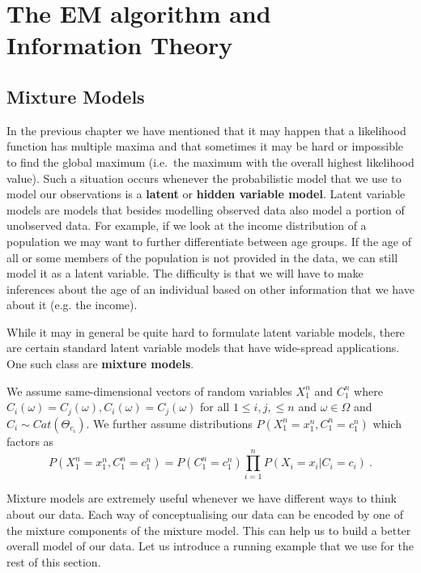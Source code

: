 \chapter{The EM algorithm and Information Theory}

\section{Mixture Models}\label{sec:mixtureModels}

In the previous chapter we have mentioned that it may happen that a likelihood function has multiple 
maxima and that sometimes it may be hard or impossible to find the global maximum (i.e.\ the maximum
with the overall highest likelihood value). Such a situation occurs whenever the probabilistic model
that we use to model our observations is a \textbf{latent} or \textbf{hidden variable model}. Latent variable
models are models that besides modelling observed data also model a portion of unobserved data. For
example, if we look at the income distribution of a population we may want to further differentiate
between age groups. If the age of all or some members of the population is not provided in the data, we
can still model it as a latent variable. The difficulty is that we will have to make inferences about the
age of an individual based on other information that we have about it (e.g. the income). 

While it may in general be quite hard to formulate latent variable models, there are certain standard
latent variable models that have wide-spread applications. One such class are \textbf{mixture models}.

\begin{Definition}\label{def:mixtureModel}
We assume same-dimensional vectors of random variables $ X_{1}^{n} $ and $ C_{1}^{n} $ where
$ C_{i}(\omega) = C_{j}(\omega), C_{i}(\omega) = C_{j}(\omega) $ for all $ 1 \leq i,j, \leq n $ and $ \omega \in \Omega $ and 
$ C_{i} \sim Cat(\Theta_{c_{i}}) $. We further assume distributions 
$ P(X_{1}^{n}=x_{1}^{n}, C_{1}^{n} = c_{1}^{n}) $ which factors as
$$ P(X_{1}^{n}=x_{1}^{n}, C_{1}^{n} = c_{1}^{n})= P(C_{1}^{n} = c_{1}^{n}) \prod_{i=1}^{n} P(X_{i}=x_{i}|C_{i} = c_{i}) \ . $$
\end{Definition}

Mixture models are extremely useful whenever we have different ways to think about our data. Each way
of conceptualising our data can be encoded by one of the mixture components of the mixture model.
This can help us to build a better overall model of our data. Let us introduce a running example that
we use for the rest of this section. 

